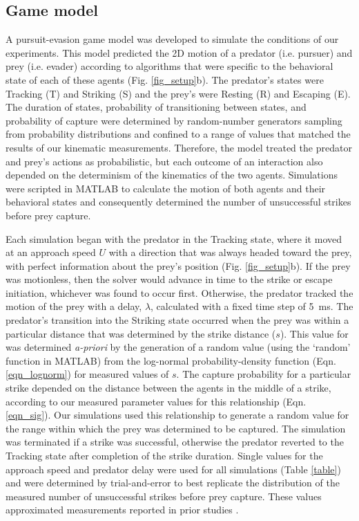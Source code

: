 \documentclass[]{rsos}%
\begin{document}
\subsection{Game model}
A pursuit-evasion game model was developed to simulate the conditions of our experiments. 
This model predicted the 2D motion of a predator (i.e. pursuer) and prey (i.e. evader) according to algorithms that were specific to the behavioral state of each of these agents (Fig. \ref{fig_setup}b). 
The predator's states were Tracking (T) and Striking (S) and the prey's were Resting (R) and Escaping (E). 
The duration of states, probability of transitioning between states, and probability of capture were determined by random-number generators sampling from probability distributions and confined to a range of values that matched the results of our kinematic measurements.
Therefore, the model treated the predator and prey's actions as probabilistic, but each outcome of an interaction also depended on the determinism of the kinematics of the two agents.
Simulations were scripted in MATLAB to calculate the motion of both agents and their behavioral states and consequently determined the number of unsuccessful strikes before prey capture.

Each simulation began with the predator in the Tracking state, where it moved at an approach speed $U$ with a direction that was always headed toward the prey, with perfect information about the prey's position (Fig. \ref{fig_setup}b). 
If the prey was motionless, then the solver would advance in time to the strike or escape initiation, whichever was found to occur first.
Otherwise, the predator tracked the motion of the prey with a delay, $\lambda$, calculated with a fixed time step of \SI{5}{\ms}.  
The predator's transition into the Striking state occurred when the prey was within a particular distance that was determined by the strike distance ($s$). 
This value for was determined \textit{a-priori} by the generation of a random value (using the `random' function in MATLAB) from the log-normal probability-density function (Eqn. \ref{eqn_lognorm}) for measured values of $s$.
The capture probability for a particular strike depended on the distance between the agents in the middle of a strike, according to our measured parameter values for this relationship (Eqn. \ref{eqn_sig}).
Our simulations used this relationship to generate a random value for the range within which the prey was determined to be captured.
The simulation was terminated if a strike was successful, otherwise the predator reverted to the Tracking state after completion of the strike duration.
Single values for the approach speed and predator delay were used for all simulations (Table \ref{table}) and were determined by trial-and-error to best replicate the distribution of the measured number of unsuccessful strikes before prey capture. 
These values approximated measurements reported in prior studies \cite{McHenry:2005tc, Stewart:2013bha}. 
\end{document}

